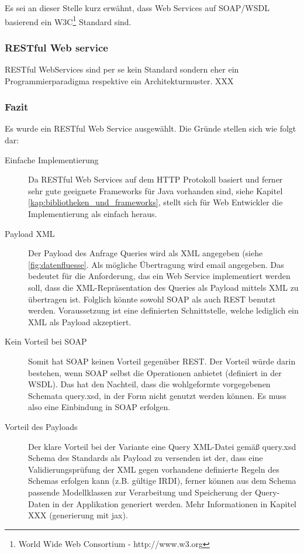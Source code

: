 Es sei an dieser Stelle kurz erwähnt, dass Web Services auf SOAP/WSDL basierend ein W3C\footnote{World Wide Web Consortium - http://www.w3.org} Standard sind. 

\subsubsection{RESTful Web service}
RESTful WebServices sind per se kein Standard sondern eher ein Programmierparadigma respektive ein Architekturmuster. 
XXX

\subsubsection{Fazit}
Es wurde ein RESTful Web Service ausgewählt. Die Gründe stellen sich wie folgt dar:

\begin{description}
\item[Einfache Implementierung] Da RESTful Web Services auf dem HTTP Protokoll basiert und ferner sehr gute geeignete Frameworks für Java vorhanden sind, siehe Kapitel \ref{kap:bibliotheken_und_frameworks}, stellt sich für Web Entwickler die Implementierung als einfach heraus.
\item[Payload XML] Der Payload des Anfrage Queries wird als XML angegeben (siehe \ref{fig:datenfluesse}. Als mögliche Übertragung wird email angegeben. Das bedeutet für die Anforderung, das ein Web Service  implementiert werden soll, dass die XML-Repräsentation des Queries als Payload mittels XML zu übertragen ist. Folglich könnte sowohl SOAP als auch REST benutzt werden. Voraussetzung ist eine definierten Schnittstelle, welche lediglich ein XML als Payload akzeptiert. 
\item[Kein Vorteil bei SOAP] Somit hat SOAP keinen Vorteil gegenüber REST. Der Vorteil würde darin bestehen, wenn SOAP selbst die Operationen anbietet (definiert in der WSDL). Das hat den Nachteil, dass die wohlgeformte vorgegebenen Schemata query.xsd, in der Form nicht genutzt werden können. Es muss also eine Einbindung in SOAP erfolgen. 
\item[Vorteil des Payloads] Der klare Vorteil bei der Variante eine Query XML-Datei gemäß query.xsd Schema des Standards als Payload zu versenden ist der, dass eine Validierungsprüfung der XML gegen vorhandene definierte Regeln des Schemas erfolgen kann (z.B. gültige IRDI), ferner können aus dem Schema passende Modellklassen zur Verarbeitung und Speicherung der Query-Daten in der Applikation generiert werden. Mehr Informationen in Kapitel XXX (generierung mit jax).  
\end{description}




